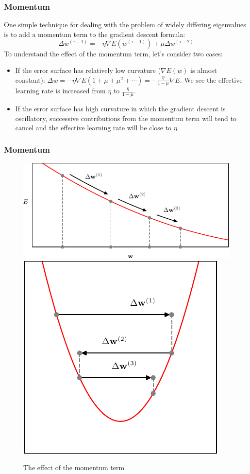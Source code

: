 \documentclass{beamer}
\begin{document}
\begin{frame}
    \frametitle{Momentum}
    One simple technique for dealing with the problem of widely differing eigenvalues is to add a momentum term to the gradient descent formula:
    \begin{equation*}
        \Delta{}w^{(\tau-1)}=-\eta\nabla{}E(w^{(\tau-1)})+\mu\Delta{}w^{(\tau-2)}
    \end{equation*}
    To understand the effect of the momentum term, let's consider two cases:
    \begin{itemize}
        \item If the error surface has relatively low curvature ($\nabla{}E(w)$ is almost constant): $\Delta{}w=-\eta\nabla{}E(1+\mu+\mu^{2}+\cdots)=-\frac{\eta}{1-\mu}\nabla{}E$. We see the effective learning rate is increased from $\eta$ to $\frac{\eta}{1-\mu}$.
        \item If the error surface has high curvature in which the gradient descent is oscillatory, successive contributions from the momentum term will tend to cancel and the effective learning rate will be close to $\eta$.
    \end{itemize}
\end{frame}

\begin{frame}
    \frametitle{Momentum}
    \begin{figure}
        \caption{The effect of the momentum term}
        \includegraphics[height=0.4\textheight]{Figure_4.pdf}
        \includegraphics[height=0.4\textheight]{Figure_5.pdf}
    \end{figure}
\end{frame}
\end{document}
